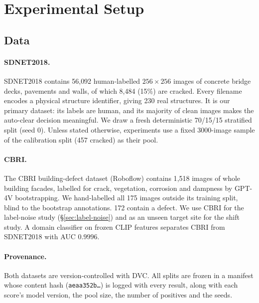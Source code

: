 
\section{Experimental Setup}
\label{sec:setup}

\subsection{Data}

\paragraph{SDNET2018.}
SDNET2018 \citep{dorafshan2018sdnet} contains 56{,}092 human-labelled
$256\times256$ images of concrete bridge decks, pavements and walls, of
which 8{,}484 (15\%) are cracked. Every filename encodes a physical
structure identifier, giving 230 real structures. It is our primary
dataset: its labels are human, and its majority of clean images makes the
auto-clear decision meaningful. We draw a fresh deterministic 70/15/15
stratified split (seed 0). Unless stated otherwise, experiments use a fixed
3000-image sample of the calibration split (457 cracked) as their pool.

\paragraph{CBRI.}
The CBRI building-defect dataset (Roboflow) contains 1{,}518 images of
whole building facades, labelled for crack, vegetation, corrosion and
dampness by GPT-4V bootstrapping. We hand-labelled all 175 images outside
its training split, blind to the bootstrap annotations. 172 contain a
defect. We use CBRI for the label-noise study (\S\ref{sec:label-noise})
and as an unseen target site for the shift study. A domain classifier on
frozen CLIP features separates CBRI from SDNET2018 with AUC $0.9996$.

\paragraph{Provenance.}
Both datasets are version-controlled with DVC. All splits are frozen in a
manifest whose content hash
(\texttt{aeaa352b\ldots}) is logged with every result, along with each
score's model version, the pool size, the number of positives and the seeds.

